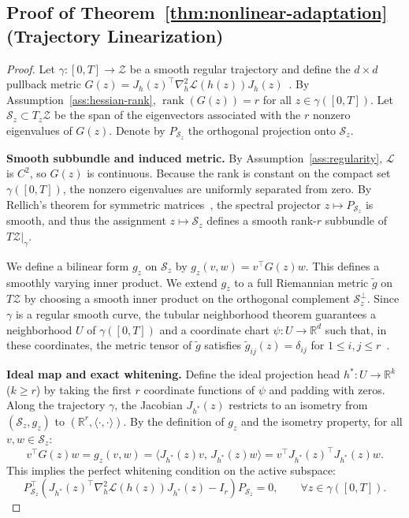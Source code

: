 \documentclass{article}
\theoremstyle{plain}
\theoremstyle{definition}
\theoremstyle{remark}
\begin{document}
\subsection{Proof of Theorem~\ref{thm:nonlinear-adaptation} (Trajectory Linearization)}

\begin{proof}
Let $\gamma:[0,T]\to\mathcal{Z}$ be a smooth regular trajectory and define the $d \times d$ pullback metric $G(z) = J_h(z)^\top \nabla_h^2\mathcal{L}(h(z)) J_h(z)$~\citep{lee2018riemannian}. By Assumption~\ref{ass:hessian-rank}, $\operatorname{rank}(G(z)) = r$ for all $z\in\gamma([0,T])$. Let $\mathcal{S}_z \subset T_z\mathcal{Z}$ be the span of the eigenvectors associated with the $r$ nonzero eigenvalues of $G(z)$. Denote by $P_{\mathcal{S}_z}$ the orthogonal projection onto $\mathcal{S}_z$.

\textbf{Smooth subbundle and induced metric.} By Assumption~\ref{ass:regularity}, $\mathcal{L}$ is $C^2$, so $G(z)$ is continuous. Because the rank is constant on the compact set $\gamma([0,T])$, the nonzero eigenvalues are uniformly separated from zero. By Rellich's theorem for symmetric matrices~\citep{kato1995perturbation}, the spectral projector $z\mapsto P_{\mathcal{S}_z}$ is smooth, and thus the assignment $z\mapsto \mathcal{S}_z$ defines a smooth rank-$r$ subbundle of $T\mathcal{Z}|_{\gamma}$.

We define a bilinear form $g_z$ on $\mathcal{S}_z$ by $g_z(v,w)= v^\top G(z) w$. This defines a smoothly varying inner product. We extend $g_z$ to a full Riemannian metric $\tilde g$ on $T\mathcal{Z}$ by choosing a smooth inner product on the orthogonal complement $\mathcal{S}_z^\perp$. Since $\gamma$ is a regular smooth curve, the tubular neighborhood theorem guarantees a neighborhood $U$ of $\gamma([0,T])$ and a coordinate chart $\psi:U\to\mathbb{R}^d$ such that, in these coordinates, the metric tensor of $\tilde g$ satisfies $\tilde g_{ij}(z) = \delta_{ij}$ for $1\le i,j\le r$~\citep{lee2012smooth}.

\textbf{Ideal map and exact whitening.} Define the ideal projection head $h^*:U\to\mathbb{R}^k$ ($k\ge r$) by taking the first $r$ coordinate functions of $\psi$ and padding with zeros. Along the trajectory $\gamma$, the Jacobian $J_{h^*}(z)$ restricts to an isometry from $(\mathcal{S}_z,g_z)$ to $(\mathbb{R}^r,\langle\cdot,\cdot\rangle)$. By the definition of $g_z$ and the isometry property, for all $v,w\in \mathcal{S}_z$:
\begin{equation*}
    v^\top G(z) w 
    = g_z(v,w) 
    = \langle J_{h^*}(z)v,\, J_{h^*}(z)w\rangle 
    = v^\top J_{h^*}(z)^\top J_{h^*}(z) w.
\end{equation*}
This implies the perfect whitening condition on the active subspace:
\begin{equation*}
    P_{\mathcal{S}_z}^\top \left( J_{h^*}(z)^\top \nabla_h^2\mathcal{L}(h(z)) J_{h^*}(z) - I_r\right) P_{\mathcal{S}_z}=0, \qquad\forall z\in\gamma([0,T]).
\end{equation*}


\end{proof}
\end{document}
